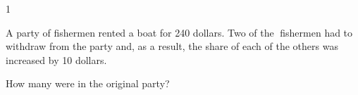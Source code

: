 
\AddToShipoutPicture*{\BackgroundPic}

\addtocounter {ProbNum} {1}

 
{\bf \Large{}} A party of fishermen rented a boat for 240 dollars. Two of the fishermen had to withdraw from the party and, as a result, the share of each of the others was increased by 10 dollars. 

\bigskip

\indent How many were in the original party?  

\vfill

\newpage
